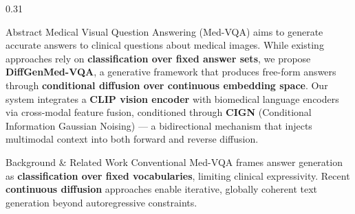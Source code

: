 \documentclass[final]{beamer}
\newcommand{\postersection}[2]{%
  \begin{block}{\LARGE #1}
    \justifying\large #2
  \end{block}
}
\begin{document}
\begin{frame}[t, fragile]
\begin{columns}[t]
\begin{column}{0.31\linewidth}

  \postersection{Abstract}{%
    Medical Visual Question Answering (Med-VQA) aims to generate accurate
    answers to clinical questions about medical images. While existing
    approaches rely on \textbf{classification over fixed answer sets}, we
    propose \textbf{DiffGenMed-VQA}, a generative framework that produces
    free-form answers through \textbf{conditional diffusion over continuous
    embedding space}. Our system integrates a \textbf{CLIP vision encoder}
    with biomedical language encoders via cross-modal feature fusion,
    conditioned through \textbf{CIGN} (Conditional Information Gaussian
    Noising) --- a bidirectional mechanism that injects multimodal context
    into both forward and reverse diffusion.
  }

  \vspace{0.2cm}

  \postersection{Background \& Related Work}{%
    Conventional Med-VQA frames answer generation as \textbf{classification over fixed vocabularies}, limiting clinical expressivity. Recent \textbf{continuous diffusion} approaches enable iterative, globally coherent text generation beyond autoregressive constraints.

    \vspace{0.8em}

}
\end{column}
\end{columns}
\end{frame}
\end{document}
